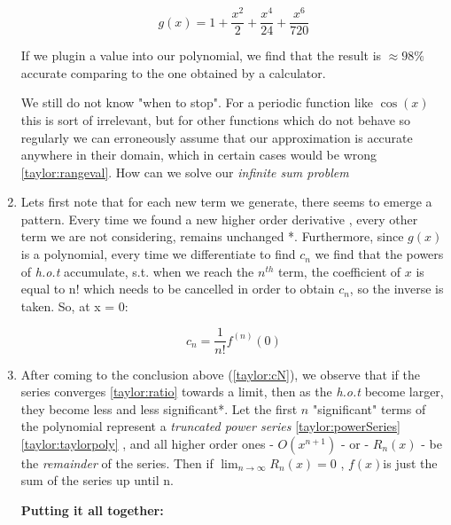 \documentclass[english,course]{Notes}
\newcommand{\ita}[1]{\textit{#1}}
\begin{document}
\begin{enumerate}
$$ g(x) = 1 + \frac{x^2}{2} + \frac{x^4}{24} + \frac{x^6}{720} $$

If we plugin a value into our polynomial, we find that the result is $\approx 98\%$ accurate comparing to the one obtained by a calculator. 

We still do not know "when to stop". For a periodic function like $\cos(x)$ this is sort of irrelevant, but for other functions which do not behave so regularly we can erroneously assume that our approximation is accurate anywhere in their domain, which in certain cases would be wrong \ref{taylor:rangeval}. How can we solve our \ita{infinite sum problem}

\item \label{taylor:cN}Lets first note that for each new term we generate, there seems to emerge a pattern. Every time we found a new higher order derivative , every other term we are not considering, remains unchanged *.  Furthermore, since $g(x)$ is a polynomial, every time we differentiate to find $c_n$ we find that the powers of \ita{h.o.t} accumulate, s.t. when we reach the $n^{th}$ term, the coefficient of $x$ is equal to n! which needs to be cancelled in order to obtain $c_n$, so the inverse is taken. So, at x = 0:

$$ c_n = \frac{1}{n!}f^{(n)}(0) $$


\item {}After coming to the conclusion above (\ref{taylor:cN}), we observe that if the series converges \ref{taylor:ratio} towards a limit, then as the \ita{h.o.t} become larger, they become less and less significant*. Let the first $n$ "significant" terms of the polynomial represent a \ita{truncated power series} \ref{taylor:powerSeries} \ref{taylor:taylorpoly} , and all higher order ones - $O(x^{n+1})$ - or - $R_n(x)$ - be the \ita{remainder} of the series. Then if $ \lim_{n\to\infty}R_n(x) = 0$ , $f(x)$is just the sum of the series up until n.


\newpage
\textbf{Putting it all together:}



\end{enumerate}
\end{document}
